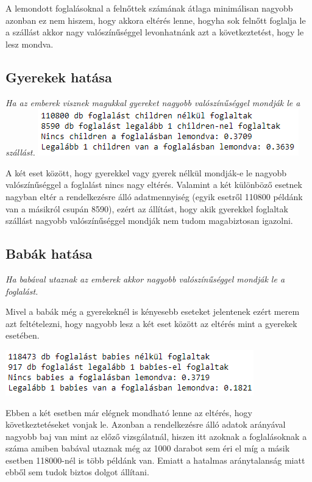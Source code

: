 A lemondott foglalásoknal a felnőttek számának átlaga minimálisan nagyobb azonban ez nem hiszem, hogy akkora eltérés lenne, hogyha sok felnőtt foglalja le a szállást akkor nagy valószínűséggel levonhatnánk azt a következtetést, hogy le lesz mondva.

\subsection{Gyerekek hatása}
\textit{Ha az emberek visznek magukkal gyereket nagyobb valószínűséggel mondják le a szállást.}
\includegraphics{images/4.fejezet/3.adatelemzes6.PNG}

A két eset között, hogy gyerekkel vagy gyerek nélkül mondják-e le nagyobb valószínűséggel a foglalást nincs nagy eltérés. Valamint a két különböző esetnek nagyban eltér a rendelkezésre álló adatmennyiség (egyik esetről 110800 példánk van a másikról csupán 8590), ezért az állítást, hogy akik gyerekkel foglaltak szállást nagyobb valószínűséggel mondják nem tudom magabiztosan igazolni.

\subsection{Babák hatása}
\textit{Ha babával utaznak az emberek akkor nagyobb valószínűséggel mondják le a foglalást.}

Mivel a babák még a gyerekeknél is kényesebb eseteket jelentenek ezért merem azt feltételezni, hogy nagyobb lesz a két eset között az eltérés mint a gyerekek esetében.

\includegraphics{images/4.fejezet/3.adatelemzes7.PNG}

Ebben a két esetben már elégnek mondható lenne az eltérés, hogy következtetéseket vonjak le. Azonban a rendelkezésre álló adatok arányával nagyobb baj van mint az előző vizsgálatnál, hiszen itt azoknak a foglalásoknak a száma amiben babával utaznak még az 1000 darabot sem éri el míg a másik esetben 118000-nél is több példánk van. Emiatt a hatalmas aránytalanság miatt ebből sem tudok biztos dolgot állítani.

